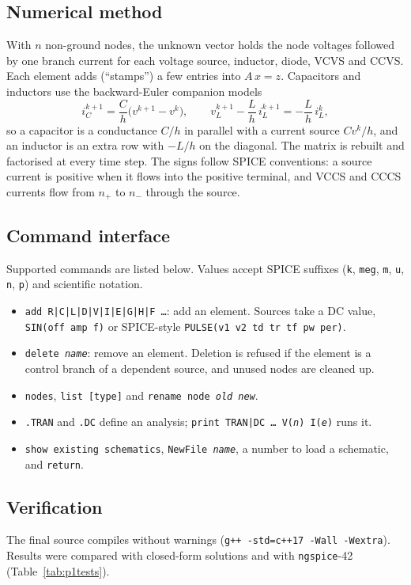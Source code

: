 \subsection{Numerical method}
With $n$ non-ground nodes, the unknown vector holds the node voltages followed by one branch current
for each voltage source, inductor, diode, VCVS and CCVS. Each element adds (``stamps'') a few entries into
$A\,x = z$. Capacitors and inductors use the backward-Euler companion models
\begin{equation*}
  i_C^{k+1} = \frac{C}{h}\bigl(v^{k+1}-v^{k}\bigr), \qquad
  v_L^{k+1} - \frac{L}{h}\, i_L^{k+1} = -\frac{L}{h}\, i_L^{k},
\end{equation*}
so a capacitor is a conductance $C/h$ in parallel with a current source $C v^k/h$, and an inductor is an
extra row with $-L/h$ on the diagonal. The matrix is rebuilt and factorised at every time step. The
signs follow SPICE conventions: a source current is positive when it flows into the positive terminal, and VCCS
and CCCS currents flow from $n_+$ to $n_-$ through the source.

\subsection{Command interface}
Supported commands are listed below. Values accept SPICE suffixes (\texttt{k}, \texttt{meg}, \texttt{m},
\texttt{u}, \texttt{n}, \texttt{p}) and scientific notation.
\begin{itemize}
  \item \texttt{add R|C|L|D|V|I|E|G|H|F \dots}: add an element. Sources take a DC value,
    \texttt{SIN(off amp f)} or SPICE-style \texttt{PULSE(v1 v2 td tr tf pw per)}.
  \item \texttt{delete \textit{name}}: remove an element. Deletion is refused if the element is a
    control branch of a dependent source, and unused nodes are cleaned up.
  \item \texttt{nodes}, \texttt{list [type]} and \texttt{rename node \textit{old new}}.
  \item \texttt{.TRAN} and \texttt{.DC} define an analysis; \texttt{print TRAN|DC \dots\ V(\textit{n}) I(\textit{e})} runs it.
  \item \texttt{show existing schematics}, \texttt{NewFile \textit{name}}, a number to load a schematic, and \texttt{return}.
\end{itemize}

\subsection{Verification}
The final source compiles without warnings (\texttt{g++ -std=c++17 -Wall -Wextra}). Results were compared
with closed-form solutions and with \texttt{ngspice}-42 (Table~\ref{tab:p1tests}).

